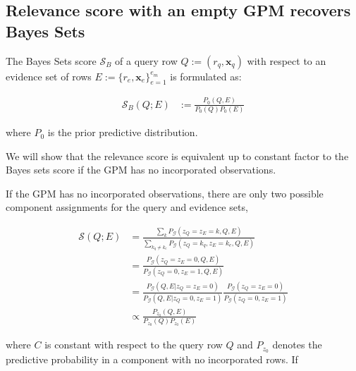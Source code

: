 \documentclass{article}
\newcommand{\mG}{\mathcal{G}}
\newcommand{\set}[1]{\{{#1}\}}
\begin{document}
\subsection{Relevance score with an empty GPM recovers Bayes Sets}

The Bayes Sets score $\mathcal{S}_B$ of a query row
$Q:=(r_q, \bm{x}_q)$ with respect to an evidence set of rows
$E:=\set{r_{e}, \bm{x}_e}_{e=1}^{e_m}$ is formulated as:

\begin{align*}
  \mathcal{S}_B(Q;E) &:= \frac{P_0(Q,E)}{P_0(Q)P_0(E)}
\end{align*}

where $P_0$ is the prior predictive distribution. 

We will show that the relevance score is equivalent up to constant
factor to the Bayes sets score if the GPM has no incorporated
observations.

If the GPM has no incorporated observations, there are only
two possible component assignments for the query and evidence
sets,

\begin{align*}
  \mathcal{S}(Q;E) &= \frac{\sum_k P_\mG(z_Q=z_E=k,Q,E)}
                     {\sum_{k_q \neq k_e} P_\mG(z_Q=k_q, z_E=k_e,Q,E)}\\
                   &= \frac{P_\mG(z_Q=z_E=0,Q,E)} {P_\mG(z_Q=0, z_E=1,Q,E)}\\
                   &=\frac{P_\mG(Q,E|z_Q=z_E=0)}{P_\mG(Q,E |z_Q=0, z_E=1)}
                     \frac{P_\mG(z_Q=z_E=0)}{P_\mG(z_Q=0, z_E=1)} \\
                   &\propto \frac{P_{z_0}(Q,E)}{P_{z_0}(Q)P_{z_0}(E)}
\end{align*}

where $C$ is constant with respect to the query row $Q$ and $P_{z_0}$ denotes the  predictive probability in a component with no incorporated rows. If 
\end{document}
